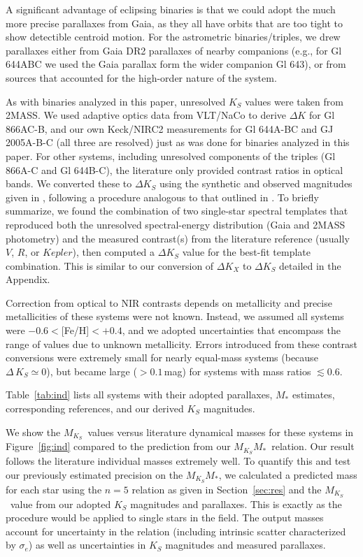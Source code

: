 \documentclass[twocolumn]{aastex62}
\newcommand{\mks}{$M_{K_S}$}
\newcommand{\mmk}{$M_{K_S}$\textendash$M_*$}
\begin{document}
A significant advantage of eclipsing binaries is that we could adopt the much more precise parallaxes from Gaia, as they all have orbits that are too tight to show detectible centroid motion. For the astrometric binaries/triples, we drew parallaxes either from Gaia DR2 parallaxes of nearby companions (e.g., for Gl 644ABC we used the Gaia parallax form the wider companion Gl 643), or from sources that accounted for the high-order nature of the system. 

As with binaries analyzed in this paper, unresolved $K_S$ values were taken from 2MASS. We used adaptive optics data from VLT/NaCo to derive $\Delta K$ for Gl 866AC-B, and our own Keck/NIRC2 measurements for Gl 644A-BC and GJ 2005A-B-C (all three are resolved) just as was done for binaries analyzed in this paper. For other systems, including unresolved components of the triples (Gl 866A-C and Gl 644B-C), the literature only provided contrast ratios in optical bands. We converted these to $\Delta K_S$ using the synthetic and observed magnitudes given in \citet{Mann2015b}, following a procedure analogous to that outlined in \citep{2017ApJ...845...72K}. To briefly summarize, we found the combination of two single-star spectral templates that reproduced both the unresolved spectral-energy distribution (Gaia and 2MASS photometry) and the measured contrast(s) from the literature reference (usually $V$, $R$, or $Kepler$), then computed a $\Delta K_S$ value for the best-fit template combination. This is similar to our conversion of $\Delta K_X$ to $\Delta K_S$ detailed in the Appendix. 

Correction from optical to NIR contrasts depends on metallicity \citep[e.g., ][]{Schlaufman2010} and precise metallicities of these systems were not known. Instead, we assumed all systems were $-0.6<$[Fe/H]$<+0.4$, and we adopted uncertainties that encompass the range of values due to unknown metallicity. Errors introduced from these contrast conversions were extremely small for nearly equal-mass systems (because $\Delta\,K_S\simeq0$), but became large ($>0.1$\,mag) for systems with mass ratios $\lesssim$0.6. 

Table~\ref{tab:ind} lists all systems with their adopted parallaxes, $M_*$ estimates, corresponding references, and our derived $K_S$ magnitudes.

We show the \mks\ values versus literature dynamical masses for these systems in Figure~\ref{fig:ind} compared to the prediction from our \mmk\ relation. Our result follows the literature individual masses extremely well. To quantify this and test our previously estimated precision on the \mmk, we calculated a predicted mass for each star using the $n=5$ relation as given in Section~\ref{sec:res} and the \mks\ value from our adopted $K_S$ magnitudes and parallaxes. This is exactly as the procedure would be applied to single stars in the field. The output masses account for uncertainty in the relation (including intrinsic scatter characterized by $\sigma_e$) as well as uncertainties in $K_S$ magnitudes and measured parallaxes. 
\end{document}
